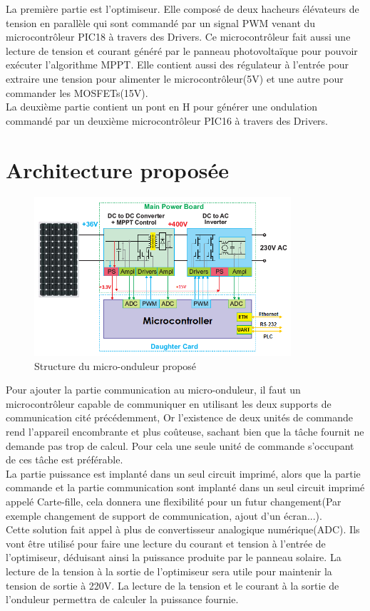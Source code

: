 \documentclass[11pt, a4paper, twoside]{book}
\begin{document}
{La première partie est l'optimiseur. Elle composé de deux hacheurs élévateurs de tension en parallèle qui sont commandé par un signal PWM venant du microcontrôleur PIC18 à travers des Drivers. Ce microcontrôleur fait aussi une lecture de tension et courant généré par le panneau photovoltaïque pour pouvoir exécuter l'algorithme MPPT. Elle contient aussi des régulateur à l'entrée pour extraire une tension pour alimenter le microcontrôleur(5V) et une autre pour commander les MOSFETs(15V).\\

La deuxième partie contient un pont en H pour générer une ondulation commandé par un deuxième microcontrôleur PIC16 à travers des Drivers.
\section{Architecture proposée}
\begin{figure}[h]
\centering
\includegraphics[width=0.85\textwidth]{newMicroinverter}
\caption{Structure du micro-onduleur proposé}
\end{figure}
Pour ajouter la partie communication au micro-onduleur, il faut un microcontrôleur capable de communiquer en utilisant les deux supports de communication cité précédemment, Or l'existence de deux unités de commande rend l'appareil encombrante et plus coûteuse, sachant bien que la tâche fournit ne demande pas trop de calcul. Pour cela une seule unité de commande s'occupant de ces tâche est préférable.\\

La partie puissance est implanté dans un seul circuit imprimé, alors que la partie commande et la partie communication sont implanté dans un seul circuit imprimé appelé Carte-fille, cela donnera une flexibilité pour un futur changement(Par exemple changement de support de communication, ajout d'un écran...).\\
Cette solution fait appel à plus de convertisseur analogique numérique(ADC). Ils vont être utilisé pour faire une lecture du courant et tension à l'entrée de l'optimiseur, déduisant ainsi la puissance produite par le panneau solaire. La lecture de la tension à la sortie de l'optimiseur sera utile pour maintenir la tension de sortie à 220V. La lecture de la tension et le courant à la sortie de l'onduleur permettra de calculer la puissance fournie.
}
\end{document}
